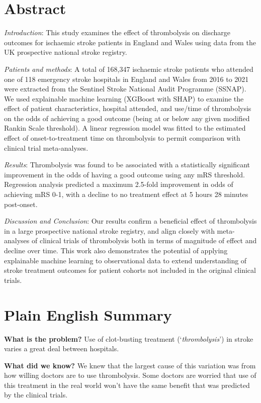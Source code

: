 
\section*{Abstract}

\textit{Introduction}: This study examines the effect of thrombolysis on discharge outcomes for ischaemic stroke patients in England and Wales using data from the UK prospective national stroke registry.

\textit{Patients and methods}: A total of 168,347 ischaemic stroke patients who attended one of 118 emergency stroke hospitals in England and Wales from 2016 to 2021 were extracted from the Sentinel Stroke National Audit Programme (SSNAP). We used explainable machine learning (XGBoost with SHAP) to examine the effect of patient characteristics, hospital attended, and use/time of thrombolysis on the odds of achieving a good outcome (being at or below any given modified Rankin Scale threshold). A linear regression model was fitted to the estimated effect of onset-to-treatment time on thrombolysis to permit comparison with clinical trial meta-analyses.

\textit{Results}: Thrombolysis was found to be associated with a statistically significant improvement in the odds of having a good outcome using any mRS threshold. Regression analysis predicted a maximum 2.5-fold improvement in odds of achieving mRS 0-1, with a decline to no treatment effect at 5 hours 28 minutes post-onset.

\textit{Discussion and Conclusion}: Our results confirm a beneficial effect of thrombolysis in a large prospective national stroke registry, and align closely with meta-analyses of clinical trials of thrombolysis both in terms of magnitude of effect and decline over time. This work also demonstrates the potential of applying explainable machine learning to observational data to extend understanding of stroke treatment outcomes for patient cohorts not included in the original clinical trials.

\section*{Plain English Summary}

\textbf{What is the problem?} Use of clot-busting treatment (`\textit{thrombolysis}') in stroke varies a great deal between hospitals.

\textbf{What did we know?} We knew that the largest cause of this variation was from how willing doctors are to use thrombolysis. Some doctors are worried that use of this treatment in the real world won’t have the same benefit that was predicted by the clinical trials.

